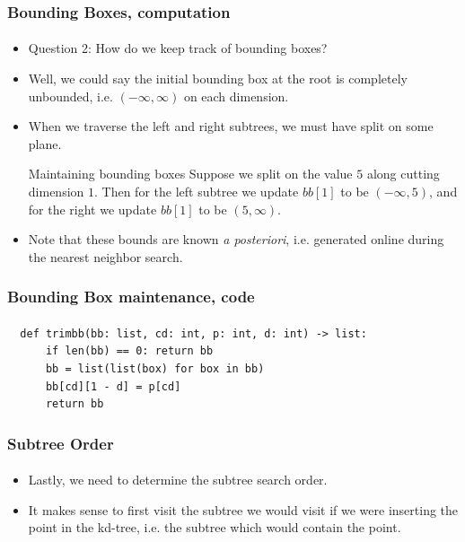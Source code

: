 \documentclass{beamer}                             %
\begin{document}
\begin{frame}
\frametitle{Bounding Boxes, computation}
\framesubtitle{}
\begin{itemize}
  \item Question 2: How do we keep track of bounding boxes?
  \item Well, we could say the initial bounding box at the root is completely
    unbounded, i.e. \( (-\infty, \infty) \) on each dimension.
  \item When we traverse the left and right
    subtrees, we must have split on some plane.
    \begin{exampleblock}{Maintaining bounding boxes}
      Suppose we split on the value \( 5 \) along cutting dimension \( 1 \).
      Then for the left subtree we update \( bb[1] \) to be \( (-\infty, 5) \),
      and for the right we update \( bb[1] \) to be \( (5, \infty) \).
    \end{exampleblock}
  \item Note that these bounds are known \textit{a posteriori},
    i.e. generated online during the nearest neighbor search.
\end{itemize}
\end{frame}

\begin{frame}[fragile]
\frametitle{Bounding Box maintenance, code}
\framesubtitle{}
\begin{verbatim}
  def trimbb(bb: list, cd: int, p: int, d: int) -> list:
      if len(bb) == 0: return bb
      bb = list(list(box) for box in bb)
      bb[cd][1 - d] = p[cd]
      return bb
\end{verbatim}
\end{frame}

\begin{frame}
\frametitle{Subtree Order}
\framesubtitle{}
\begin{itemize}
  \item Lastly, we need to determine the subtree search order.
  \item It makes sense to first visit the subtree we
    would visit if we were inserting the point in the
    kd-tree, i.e. the subtree which would contain the point.
\end{itemize}
\end{frame}
\end{document}
